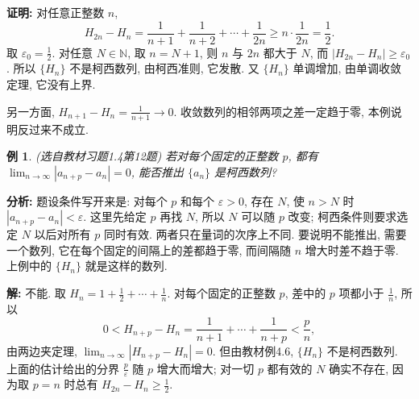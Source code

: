 \documentclass[UTF8,openany]{ctexbook}
\theoremstyle{chinesetextbook}
\newtheorem{example}{例}[section]
\newenvironment{cnproof}{\par\indent\textbf{证明:} \ignorespaces}{\par}
\newenvironment{cnsolution}{\par\indent\textbf{解:} \ignorespaces}{\par}
\begin{document}
\begin{cnproof}
对任意正整数 $n$,
\[
H_{2n}-H_n=\frac1{n+1}+\frac1{n+2}+\cdots+\frac1{2n}\ge n\cdot\frac1{2n}=\frac12.
\]
取 $\displaystyle\varepsilon_0=\frac12$. 对任意 $N\in\mathbb N$, 取 $n=N+1$, 则 $n$ 与 $2n$ 都大于 $N$, 而 $|H_{2n}-H_n|\ge\varepsilon_0$. 所以 $\{H_n\}$ 不是柯西数列, 由柯西准则, 它发散. 又 $\{H_n\}$ 单调增加, 由单调收敛定理, 它没有上界.

另一方面, $\displaystyle H_{n+1}-H_n=\frac1{n+1}\to0$. 收敛数列的相邻两项之差一定趋于零, 本例说明反过来不成立.
\end{cnproof}
\begin{example}
\textnormal{(选自教材习题1.4第12题)} 若对每个固定的正整数 $p$, 都有 $\displaystyle\lim_{n\to\infty}|a_{n+p}-a_n|=0$, 能否推出 $\{a_n\}$ 是柯西数列?
\end{example}
\par\indent\textbf{分析:} 题设条件写开来是: 对每个 $p$ 和每个 $\varepsilon>0$, 存在 $N$, 使 $n>N$ 时 $|a_{n+p}-a_n|<\varepsilon$. 这里先给定 $p$ 再找 $N$, 所以 $N$ 可以随 $p$ 改变; 柯西条件则要求选定 $N$ 以后对所有 $p$ 同时有效. 两者只在量词的次序上不同. 要说明不能推出, 需要一个数列, 它在每个固定的间隔上的差都趋于零, 而间隔随 $n$ 增大时差不趋于零. 上例中的 $\{H_n\}$ 就是这样的数列.
\begin{cnsolution}
不能. 取 $\displaystyle H_n=1+\frac12+\cdots+\frac1n$. 对每个固定的正整数 $p$, 差中的 $p$ 项都小于 $\displaystyle\frac1n$, 所以
\[
0<H_{n+p}-H_n=\frac1{n+1}+\cdots+\frac1{n+p}<\frac pn,
\]
由两边夹定理, $\displaystyle\lim_{n\to\infty}|H_{n+p}-H_n|=0$. 但由教材例4.6, $\{H_n\}$ 不是柯西数列. 上面的估计给出的分界 $\displaystyle\frac p\varepsilon$ 随 $p$ 增大而增大; 对一切 $p$ 都有效的 $N$ 确实不存在, 因为取 $p=n$ 时总有 $\displaystyle H_{2n}-H_n\ge\frac12$.
\end{cnsolution}
\end{document}
